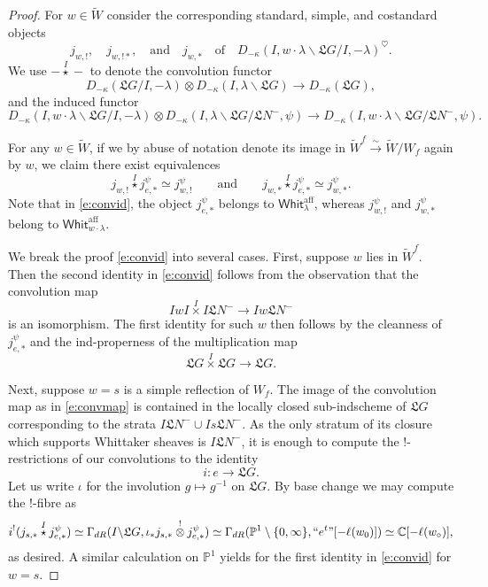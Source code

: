 \documentclass[11pt,reqno]{amsart}
\newcommand{\aff}{\operatorname{aff}}
\newcommand{\fL}{\mathfrak{L}}
\theoremstyle{remark}
\numberwithin{equation}{section}
\newcommand{\Whit}{\mathsf{Whit}}
\begin{document}
\begin{proof}
	
	For $w \in \widetilde{W}$ consider the corresponding standard, simple, and 
	costandard objects 
	\[ j_{w, !}, \quad  j_{w, !*}, \quad \text{and} \quad  j_{w, *} \quad 
	\text{of} \quad D_{-\kappa}(I, w \cdot \lambda \backslash 
	\fL G / I, -\lambda)^{\heartsuit}.\]
	\noindent We use $-\overset{I}{\star}-$ to denote the convolution functor
	\[ D_{-\kappa}(\fL G / I, -\lambda) \otimes D_{-\kappa}(I, \lambda 
	\backslash \fL G) \rightarrow D_{-\kappa}(\fL G),\]
	and the induced functor
	\begin{equation}
	D_{-\kappa}(I, w \cdot \lambda \backslash \fL G / I, -\lambda ) \otimes 
	D_{-\kappa}(I, \lambda \backslash \fL G / \fL N^-, \psi) \rightarrow 
	D_{-\kappa}(I, w \cdot \lambda \backslash \fL G / \fL N^-, \psi).
	\label{e:convrat}
	\end{equation}
	
	For any $w \in \widetilde{W}$, if we by abuse of notation denote its image 
	in 
	$\widetilde{W}^f \xrightarrow{\sim} \widetilde{W}/W_f$ again by $w$, we 
	claim 
	there exist equivalences
	\begin{equation}\label{e:convid} 
	j_{w, !} \overset{I}{\star} j_{e, *}^\psi \simeq j_{w, 
		!}^\psi \quad \quad 
	\text{and} 
	\quad \quad j_{w, *} 
	\overset{I}{\star} j_{e, *}^\psi \simeq j_{w, *}^\psi. 
	\end{equation}
	Note that in \eqref{e:convid}, the object $j_{e, *}^\psi$ belongs to 
	$\Whit_{\lambda}^{\aff}$, whereas $j_{w, !}^\psi$ and $j_{w, *}^\psi$ 
	belong to $\Whit_{w \cdot \lambda}^{\aff}$.
	
	
	We break the proof \eqref{e:convid} into several cases. First, suppose $w$ 
	lies in 
	$\widetilde{W}^f$. 
	Then the second identity in \eqref{e:convid} 
	follows from the observation that the convolution map 
	\begin{equation}
	\label{e:convmap}
	IwI \overset{I}{\times} I\fL N^- \rightarrow Iw \fL N^-
	\end{equation}
	is an isomorphism. The first identity for such $w$ then follows by the 
	cleanness of $j_{e, *}^\psi$ and the ind-properness of the multiplication
	map
	\[
	\fL G \overset{I}{\times} \fL G \rightarrow \fL G.
	\]
	
	Next, suppose $w = s$ is a simple reflection of $W_f$. 
	The image of the convolution map as in \eqref{e:convmap} is contained in 
	the locally closed sub-indscheme of $\fL G$ corresponding to the strata 
	$I \fL N^- \cup I s \fL N^-$. As the only stratum of its closure which
	supports Whittaker sheaves is $I \fL N^-$, 
	it is enough to compute the $!$-restrictions of our
	convolutions to the identity 
	\[i: e \rightarrow \fL G.\]
	Let us write $\iota$ for the involution $g \mapsto g^{-1}$ on $\fL G$. By 
	base change we may compute the $!$-fibre as  
	\[
	i^!(j_{s,*} \overset{I}{\star} j_{e,*}^{\psi}) \simeq 
	\Gamma_{dR}(I \backslash \fL G, \iota_* j_{s, *} \overset{!}{\otimes} j_{e, 
	*}^\psi) \simeq
	\Gamma_{dR}(\mathbb{P}^1\setminus \{0,\infty\},``e^t"[-\ell(w_0)]) \simeq 
	\mathbb{C}[- \ell({w_\circ})],
	\]
	as desired. A similar calculation on $\mathbb{P}^1$ yields for
	the first identity in \eqref{e:convid} for $w = s$.
	

\end{proof}
\end{document}
